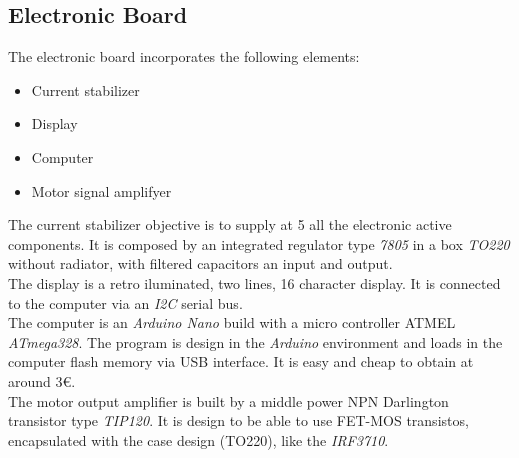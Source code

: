 \subsection{Electronic Board}
    The electronic board incorporates the following elements:
    \begin{itemize}
        \item Current stabilizer  %
        \item Display %
        \item Computer %
        \item Motor signal amplifyer  %
    \end{itemize}
    The current stabilizer objective is to supply at 5 \Vcc all the electronic active components. It is composed by an integrated regulator type \textit{7805} in a box \textit{TO220} without radiator, with filtered capacitors an input and output.\\

    The display is a retro iluminated, two lines, 16 character display. It is connected to the computer via an \textit{I2C} serial bus.\\
    
    The computer is an \textit{Arduino Nano} build with a micro controller ATMEL \textit{ATmega328}. The program is design in the \textit{Arduino} environment and loads in the computer flash memory via USB interface. It is easy and cheap to obtain at around 3€.\\
    
    The motor output amplifier is built by a middle power NPN Darlington transistor type \textit{TIP120}. It is design to be able to use FET-MOS transistos, encapsulated with the case design (TO220), like the \textit{IRF3710}.\\
    
